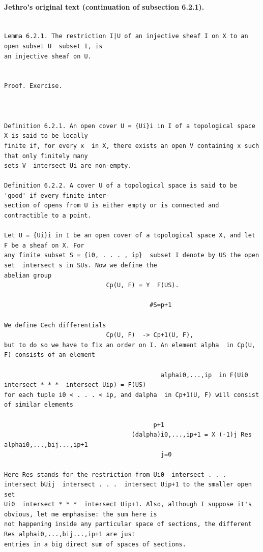 \paragraph{Jethro's original text (continuation of subsection 6.2.1).}
\begin{Verbatim}[fontsize=\footnotesize]

Lemma 6.2.1. The restriction I|U of an injective sheaf I on X to an open subset U  subset I, is
an injective sheaf on U.


Proof. Exercise.



Definition 6.2.1. An open cover U = {Ui}i in I of a topological space X is said to be locally
finite if, for every x  in X, there exists an open V containing x such that only finitely many
sets V  intersect Ui are non-empty.

Definition 6.2.2. A cover U of a topological space is said to be 'good' if every finite inter-
section of opens from U is either empty or is connected and contractible to a point.

Let U = {Ui}i in I be an open cover of a topological space X, and let F be a sheaf on X. For
any finite subset S = {i0, . . . , ip}  subset I denote by US the open set  intersect s in SUs. Now we define the
abelian group
                            Cp(U, F) = Y  F(US).

                                        #S=p+1

We define Cech differentials
                            Cp(U, F)  -> Cp+1(U, F),
but to do so we have to fix an order on I. An element alpha  in Cp(U, F) consists of an element

                                           alphai0,...,ip  in F(Ui0  intersect * * *  intersect Uip) = F(US)
for each tuple i0 < . . . < ip, and dalpha  in Cp+1(U, F) will consist of similar elements

                                         p+1
                                   (dalpha)i0,...,ip+1 = X (-1)j Res alphai0,...,bij...,ip+1
                                           j=0

Here Res stands for the restriction from Ui0  intersect . . .  intersect bUij  intersect . . .  intersect Uip+1 to the smaller open set
Ui0  intersect * * *  intersect Uip+1. Also, although I suppose it's obvious, let me emphasise: the sum here is
not happening inside any particular space of sections, the different Res alphai0,...,bij...,ip+1 are just
entries in a big direct sum of spaces of sections.


\end{Verbatim}
